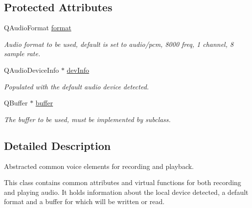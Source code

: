 \subsection*{\-Protected \-Attributes}
\begin{DoxyCompactItemize}
\item 
\-Q\-Audio\-Format \hyperlink{class_abstract_voice_aa8718f0af1669ef7a84347c2d9a54cf9}{format}
\begin{DoxyCompactList}\small\item\em \-Audio format to be used, default is set to audio/pcm, 8000 freq, 1 channel, 8 sample rate. \end{DoxyCompactList}\item 
\hypertarget{class_abstract_voice_ac27882c5cb69564cbc4d5cca7847a359}{
\-Q\-Audio\-Device\-Info $\ast$ \hyperlink{class_abstract_voice_ac27882c5cb69564cbc4d5cca7847a359}{dev\-Info}}
\label{class_abstract_voice_ac27882c5cb69564cbc4d5cca7847a359}

\begin{DoxyCompactList}\small\item\em \-Populated with the default audio device detected. \end{DoxyCompactList}\item 
\-Q\-Buffer $\ast$ \hyperlink{class_abstract_voice_a93b7c2b08aa97b77b8126a8dff173018}{buffer}
\begin{DoxyCompactList}\small\item\em \-The buffer to be used, must be implemented by subclass. \end{DoxyCompactList}\end{DoxyCompactItemize}


\subsection{\-Detailed \-Description}
\-Abstracted common voice elements for recording and playback. 

\-This class contains common attributes and virtual functions for both recording and playing audio. \-It holds information about the local device detected, a default format and a buffer for which will be written or read. 

